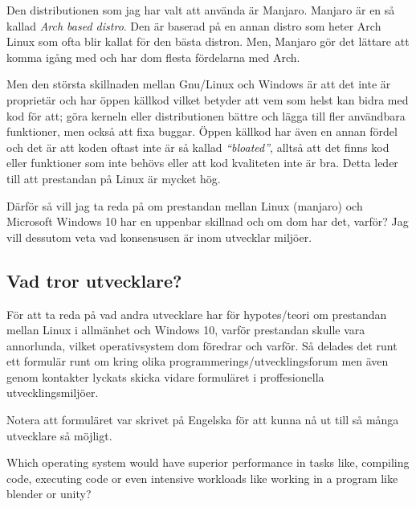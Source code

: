\documentclass[a4paper, 12pt]{report}
\begin{document}
    Den distributionen som jag har valt att använda är Manjaro\cite{manjaro}. Manjaro är en så kallad \textit{Arch based distro}. Den är baserad på en annan distro som heter Arch Linux som ofta blir kallat för den bästa distron. Men, Manjaro gör det lättare att komma igång med och har dom flesta fördelarna med Arch.

    Men den största skillnaden mellan Gnu/Linux och Windows är att det inte är proprietär och har öppen källkod vilket betyder att vem som helst kan bidra med kod för att; göra kerneln eller distributionen bättre och lägga till fler användbara funktioner, men också att fixa buggar. Öppen källkod har även en annan fördel och det är att koden oftast inte är så kallad \textit{``bloated''}, alltså att det finns kod eller funktioner som inte behövs eller att kod kvaliteten inte är bra. Detta leder till att prestandan på Linux är mycket hög. 
    
    Därför så vill jag ta reda på om prestandan mellan Linux (manjaro) och Microsoft Windows 10 har en uppenbar skillnad och om dom har det, varför? Jag vill dessutom veta vad konsensusen är inom utvecklar miljöer.
\subsection{Vad tror utvecklare?}

    För att ta reda på vad andra utvecklare har för hypotes/teori om prestandan mellan Linux i allmänhet och Windows 10, varför prestandan skulle vara annorlunda, vilket operativsystem dom föredrar och varför.  Så delades det runt ett formulär runt om kring olika programmerings/utvecklingsforum men även genom kontakter lyckats skicka vidare formuläret i proffesionella utvecklingsmiljöer.

    Notera att formuläret var skrivet på Engelska för att kunna nå ut till så många utvecklare så möjligt.


    \vspace{8.7cm}


    \large {Which operating system would have superior performance in tasks like, compiling code, executing code or even intensive workloads like working in a program  like blender or unity?}

    \vspace{.2cm}

\end{document}
